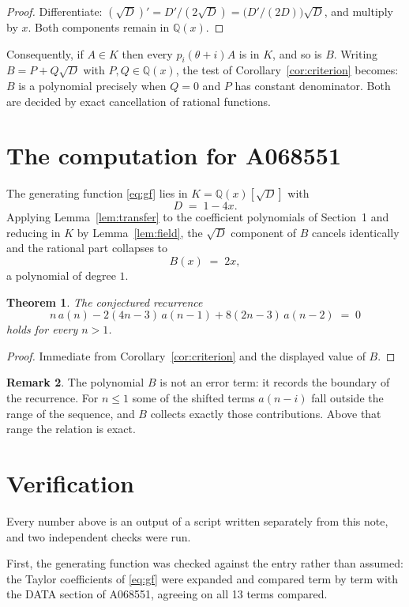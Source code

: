 \documentclass[11pt,a4paper]{article}
\theoremstyle{plain}
\newtheorem{theorem}{Theorem}
\theoremstyle{definition}
\newtheorem{remark}[theorem]{Remark}
\begin{document}
\begin{proof}
Differentiate: $(\sqrt{D})'=D'/(2\sqrt{D})=\bigl(D'/(2D)\bigr)\sqrt{D}$, and multiply by
$x$. Both components remain in $\mathbb{Q}(x)$.
\end{proof}

Consequently, if $A\in K$ then every $p_{i}(\theta+i)A$ is in $K$, and so is $B$. Writing
$B=P+Q\sqrt{D}$ with $P,Q\in\mathbb{Q}(x)$, the test of Corollary~\ref{cor:criterion}
becomes: $B$ is a polynomial precisely when $Q=0$ and $P$ has constant denominator. Both
are decided by exact cancellation of rational functions.

\section{The computation for A068551}

The generating function \eqref{eq:gf} lies in $K=\mathbb{Q}(x)[\sqrt{D}]$ with
\[
D \;=\; 1 - 4 x .
\]
Applying Lemma~\ref{lem:transfer} to the coefficient polynomials of Section~1 and reducing
in $K$ by Lemma~\ref{lem:field}, the $\sqrt{D}$ component of $B$ cancels identically and
the rational part collapses to
\[
B(x)\;=\;2 x ,
\]
a polynomial of degree $1$.

\begin{theorem}
The conjectured recurrence
\[
n\,a(n) -  2 \left(4 n - 3\right)\,a(n-1) + 8 \left(2 n - 3\right)\,a(n-2) \;=\;0
\]
holds for every $n>1$.
\end{theorem}

\begin{proof}
Immediate from Corollary~\ref{cor:criterion} and the displayed value of $B$.
\end{proof}

\begin{remark}
The polynomial $B$ is not an error term: it records the boundary of the recurrence. For
$n\le1$ some of the shifted terms $a(n-i)$ fall outside the range of the sequence,
and $B$ collects exactly those contributions. Above that range the relation is exact.
\end{remark}

\section{Verification}

Every number above is an output of a script written separately from this note, and two
independent checks were run.

First, the generating function was checked against the entry rather than assumed: the
Taylor coefficients of \eqref{eq:gf} were expanded and compared term by term with the DATA
section of A068551, agreeing on all 13 terms compared.
\end{document}
